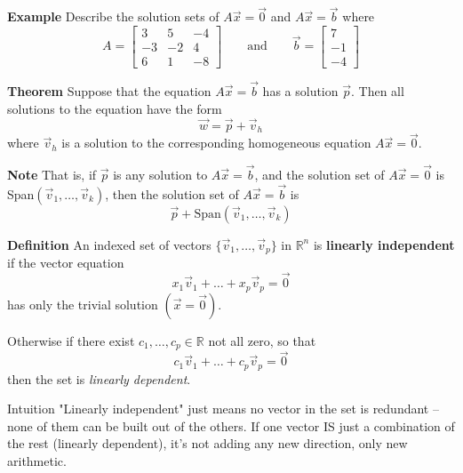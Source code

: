   \begin{frame}[fragile]
\textbf{Example}
Describe the solution sets of $A\vec{x}=\vec{0}$ and  $A \vec{x} = \vec{b}$ where 
\[
 A = \left[\begin{array}{rrr}
      3 &  5 &  -4 \\
     -3 & -2 &   4 \\
      6 &  1  &   -8 
     \end{array}\right]
\qquad  \mbox{and} \qquad
\vec{b} = \left[ \begin{array}{r}
                 7 \\ -1 \\ -4
                \end{array}\right]
\]


\end{frame}

  \begin{frame}[fragile]
\textbf{Theorem} Suppose that the equation $A \vec{x} = \vec{b}$ 
has a solution $\vec{p}$.  Then all solutions to the equation have the 
form 
\[
 \vec{w} = \vec{p } + \vec{v}_h
\]
where $\vec{v}_h$ is a solution to the corresponding homogeneous 
equation $A \vec{x} = \vec{0}$.


\textbf{Note}
That is, if $\vec{p}$ is any solution to $A \vec{x} = \vec{b}$,
and the solution set of $A \vec{x} = \vec{0}$ is 
Span$(\vec{v}_1, \dots , \vec{v}_k)$, then the solution set of 
$A \vec{x} = \vec{b}$ is 
\[ \vec{p} + \mbox{Span}(\vec{v}_1, \dots , \vec{v}_k) \]

\end{frame}

  \begin{frame}[fragile]
\textbf{Definition}  An indexed set of vectors 
$\{ \vec{v}_1, \dots , \vec{v}_p \}$ in $\mathbb R^n$ is \textbf{linearly independent}
if the vector equation 
\[
 x_1 \vec{v}_1 + \dots + x_p \vec{v}_p = \vec{0}
\]
has only the trivial solution $(\vec{x} = \vec{0})$.

Otherwise if there exist $c_1,\dots, c_p \in \mathbb R$ not all zero, so that
\[
 c_1 \vec{v}_1 + \dots + c_p \vec{v}_p = \vec{0}
\]
then the set is {\em linearly dependent}.

\begin{block}{Intuition}
"Linearly independent" just means no vector in the set is redundant -- none of them can be built out of the others. If one vector IS just a combination of the rest (linearly dependent), it's not adding any new direction, only new arithmetic.
\end{block}

\end{frame}

